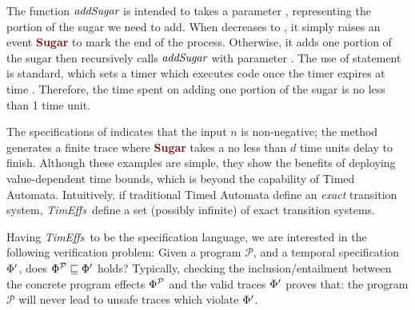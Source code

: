 \documentclass[acmsmall,10pt,review]{acmart}
\newcommand{\timedEffects}{\emph{TimEffs}}
\newcommand{\effect}{\textcolor{black}{\ensuremath{\mathrm{\Phi}}}}
\newcommand{\anyevent}[1]{{\textcolor{darkred}
{{\textbf{\footnotesize #1}}}}}
\newcommand{\code}[1]{{\tt{\ensuremath{\m{#1}}}}}
\newcommand{\CONTAIN}{\sqsubseteq}
\newcommand{\m}{\mathit}
\newcommand{\mysharp}{{\mathrel{\texttt{\#}}}}
\def\defeq{\ensuremath{\,\triangleq}}
\begin{document}
The function 
\code{\emph{addSugar}} is intended to takes a parameter , representing 
the portion of the sugar we need to add. When  decreases to , 
it simply raises an event \anyevent{Sugar} to mark the end of the process. 
Otherwise, it adds one portion of the sugar then recursively calls \code{\emph{addSugar}} with parameter . 
The use of statement  is standard, 
which sets a timer which executes code  once the timer 
expires at time . 
Therefore, the time spent on adding one portion of the sugar is 
no less than 1 time unit. 


The specifications of   indicates that the 
input  \code{n} is non-negative; the method 
generates a finite trace where \anyevent{Sugar} takes a no less 
than \code{d} time units delay to finish. 
Although these examples are simple, they show the benefits of deploying 
value-dependent 
time bounds, which is beyond the capability of Timed Automata. Intuitively, if traditional Timed Automata define an 
\emph{exact} transition system, \timedEffects\ define 
a set (possibly infinite) of exact transition systems. 
 
   

Having \timedEffects\ to be  the specification language, we are interested in the following verification problem: 
Given a program \code{\mathcal{P}},
and a temporal specification \code{\effect^{\prime}}, does 
\code{\effect^{\mathcal{P}} \CONTAIN \effect^{\prime}} holds? Typically, 
checking the inclusion/entailment between the concrete program effects \code{\effect^{\mathcal{P}}} and the valid traces \code{\effect^{\prime}} proves that: the program \code{\mathcal{P}} will never lead to unsafe traces which violate \code{\effect^{\prime}}.
\end{document}

